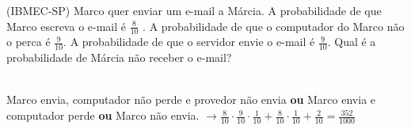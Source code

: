 \begin{ex}
(IBMEC-SP) Marco quer enviar um e-mail a Márcia. A probabilidade de que Marco escreva o e-mail é $\frac{8}{10}$ . A probabilidade de que o computador do Marco não o perca é $\frac{9}{10}$. A probabilidade de que o servidor envie o e-mail é $\frac{9}{10}$. Qual é a probabilidade de Márcia não receber o e-mail?
  \begin{sol}
    \phantom{A} \\
    Marco envia, computador não perde e provedor não envia \textbf{ou} Marco envia e computador perde \textbf{ou} Marco não envia. 
    $\rightarrow\frac{8}{10}\cdot\frac{9}{10}\cdot\frac{1}{10}+\frac{8}{10}\cdot\frac{1}{10}+\frac{2}{10}=\frac{352}{1000}$
  \end{sol}
\end{ex}